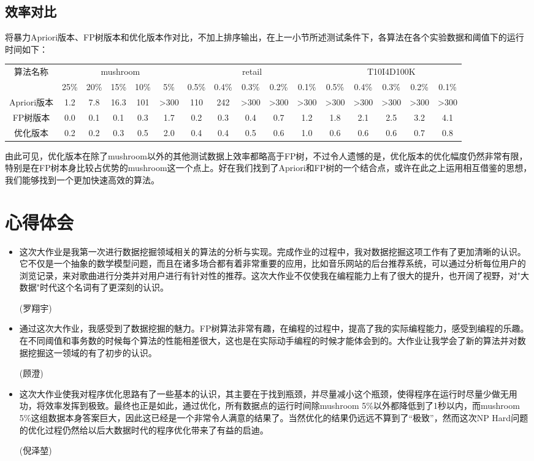 \documentclass[a4paper,9pt]{article}
\begin{document}
\subsection{效率对比}
将暴力Apriori版本、FP树版本和优化版本作对比，不加上排序输出，在上一小节所述测试条件下，各算法在各个实验数据和阈值下的运行时间如下：
\begin{footnotesize}\begin{center}\begin{tabular}{cccccccccccccccc}
	\multirow{2}{*}{算法名称}&\multicolumn{5}{c}{mushroom}&\multicolumn{5}{c}{retail}&\multicolumn{5}{c}{T10I4D100K}\\
	&25\%&20\%&15\%&10\%&5\%&0.5\%&0.4\%&0.3\%&0.2\%&0.1\%&0.5\%&0.4\%&0.3\%&0.2\%&0.1\%\\\hline
	Apriori版本&1.2&7.8&16.3&101&>300&110&242&>300&>300&>300&>300&>300&>300&>300&>300\\
	FP树版本&0.0&0.1&0.1&0.3&1.7&0.2&0.3&0.4&0.7&1.2&1.8&2.1&2.5&3.2&4.1\\
	优化版本&0.2&0.2&0.3&0.5&2.0&0.4&0.4&0.5&0.6&1.0&0.6&0.6&0.6&0.7&0.8
\end{tabular}\end{center}\end{footnotesize}

由此可见，优化版本在除了mushroom以外的其他测试数据上效率都略高于FP树，不过令人遗憾的是，优化版本的优化幅度仍然非常有限，特别是在FP树本身比较占优势的mushroom这一个点上。好在我们找到了Apriori和FP树的一个结合点，或许在此之上运用相互借鉴的思想，我们能够找到一个更加快速高效的算法。

\section{心得体会}

\begin{itemize}
	\item{} 这次大作业是我第一次进行数据挖掘领域相关的算法的分析与实现。完成作业的过程中，我对数据挖掘这项工作有了更加清晰的认识。它不仅是一个抽象的数学模型问题，而且在诸多场合都有着非常重要的应用，比如音乐网站的后台推荐系统，可以通过分析每位用户的浏览记录，来对歌曲进行分类并对用户进行有针对性的推荐。这次大作业不仅使我在编程能力上有了很大的提升，也开阔了视野，对"大数据"时代这个名词有了更深刻的认识。

		(罗翔宇)
	\item {} 通过这次大作业，我感受到了数据挖掘的魅力。FP树算法非常有趣，在编程的过程中，提高了我的实际编程能力，感受到编程的乐趣。在不同阈值和事务数的时候每个算法的性能相差很大，这也是在实际动手编程的时候才能体会到的。大作业让我学会了新的算法并对数据挖掘这一领域的有了初步的认识。

		(顾澄)
	\item{} 这次大作业使我对程序优化思路有了一些基本的认识，其主要在于找到瓶颈，并尽量减小这个瓶颈，使得程序在运行时尽量少做无用功，将效率发挥到极致。最终也正是如此，通过优化，所有数据点的运行时间除mushroom 5\%以外都降低到了1秒以内，而mushroom 5\%这组数据本身答案巨大，因此这已经是一个非常令人满意的结果了。当然优化的结果仍远远不算到了“极致”，然而这次NP Hard问题的优化过程仍然给以后大数据时代的程序优化带来了有益的启迪。

		(倪泽堃)
\end{itemize}
\end{document}
